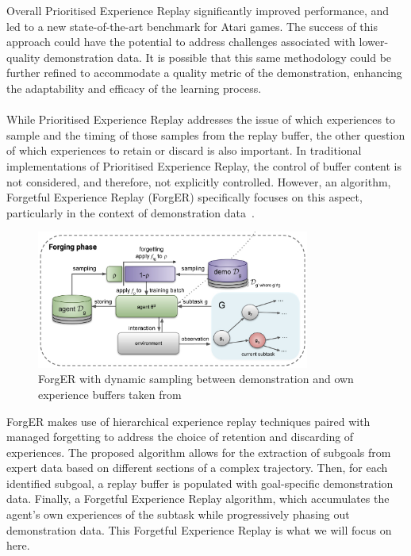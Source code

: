 Overall Prioritised Experience Replay significantly improved performance, and led to a new state-of-the-art benchmark for Atari games.
The success of this approach could have the potential to address challenges associated with lower-quality demonstration data.
It is possible that this same methodology could be further refined to accommodate a quality metric of the demonstration, enhancing the adaptability and efficacy of the learning process. \\\\



While Prioritised Experience Replay addresses the issue of which experiences to sample and the timing of those samples from the replay buffer, the other question of which experiences to retain or discard is also important. 
In traditional implementations of Prioritised Experience Replay, the control of buffer content is not considered, and therefore, not explicitly controlled. 
However, an algorithm, Forgetful Experience Replay (ForgER) specifically focuses on this aspect, particularly in the context of demonstration data~\cite{fyp16-forgetful-experience-replay}.

\begin{figure}[htbp]
  \centering
  \includegraphics[width=0.8\textwidth]{background/fyp16-forger-arch.png}
  \caption{ForgER with dynamic sampling between demonstration and own experience buffers taken from~\cite{fyp16-forgetful-experience-replay}}
\label{fig:fyp16-forger-arch}
\end{figure}

ForgER makes use of hierarchical experience replay techniques paired with managed forgetting to address the choice of retention and discarding of experiences. 
The proposed algorithm allows for the extraction of subgoals from expert data based on different sections of a complex trajectory. 
Then, for each identified subgoal, a replay buffer is populated with goal-specific demonstration data. 
Finally, a Forgetful Experience Replay algorithm, which accumulates the agent's own experiences of the subtask while progressively phasing out demonstration data.
This Forgetful Experience Replay is what we will focus on here.

